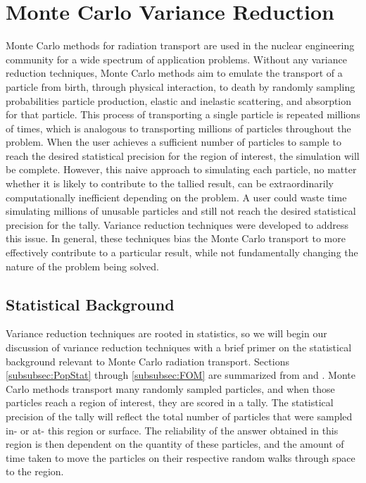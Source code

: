 \section{Monte Carlo Variance Reduction}
\label{sec:MCvar}

Monte Carlo methods for radiation transport are used in the nuclear
engineering community for a wide spectrum of application problems. Without any
variance reduction techniques, Monte Carlo methods aim to emulate
the transport of a particle from birth, through physical interaction, to death
by randomly sampling probabilities particle production, elastic and inelastic
scattering, and absorption for that particle.
This process of transporting a single particle
is repeated millions of times, which is analogous to transporting
millions of particles throughout the problem. When the user achieves a
sufficient
number of particles to sample to reach the desired statistical precision for
the region of interest, the
simulation will be complete. However, this naive approach to simulating each
particle, no matter whether it is likely to contribute to the tallied result,
can be extraordinarily computationally inefficient depending on the problem. A
user could waste time simulating millions of unusable particles and still not
reach the desired statistical precision for the tally. Variance
reduction techniques were developed to address this issue. In general, these
techniques bias the Monte Carlo transport to more effectively
contribute to a particular result, while not fundamentally changing the nature
of the problem being solved.

\subsection{Statistical Background}
\label{subsec:StatBkgnd}

Variance reduction techniques are rooted in statistics, so we will begin our
discussion of variance reduction techniques with a brief primer on the
statistical background relevant to Monte Carlo radiation transport. Sections
\ref{subsubsec:PopStat} through \ref{subsubsec:FOM} are summarized from
\cite{lewis_computational_1984} and \cite{mcnp_manual_v1}.
Monte Carlo
methods transport many randomly sampled
particles, and when those particles reach a region of interest, they are scored
in a tally. The statistical precision of the tally
will reflect the total number of particles that were sampled in- or at- this
region or surface.
The reliability of the answer obtained in this region is then dependent
on the quantity of these particles,
and the amount of time taken to move the particles on
their respective random walks through space to the region.


